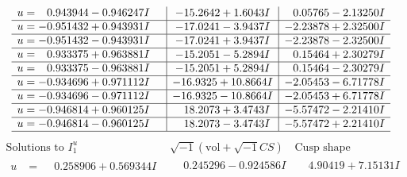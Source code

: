 \documentclass[1p]{elsarticle_modified}
\theoremstyle{definition}
\newcommand{\I}{\sqrt{-1}}
\begin{document}
$$\begin{array}{c|c|c}
\begin{aligned}
u &= \phantom{-}0.943944 - 0.946247 I\end{aligned}
 & -15.2642 + 1.6043 I & \phantom{-}0.05765 - 2.13250 I \\ \hline\begin{aligned}
u &= -0.951432 + 0.943931 I\end{aligned}
 & -17.0241 - 3.9437 I & -2.23878 + 2.32500 I \\ \hline\begin{aligned}
u &= -0.951432 - 0.943931 I\end{aligned}
 & -17.0241 + 3.9437 I & -2.23878 - 2.32500 I \\ \hline\begin{aligned}
u &= \phantom{-}0.933375 + 0.963881 I\end{aligned}
 & -15.2051 - 5.2894 I & \phantom{-}0.15464 + 2.30279 I \\ \hline\begin{aligned}
u &= \phantom{-}0.933375 - 0.963881 I\end{aligned}
 & -15.2051 + 5.2894 I & \phantom{-}0.15464 - 2.30279 I \\ \hline\begin{aligned}
u &= -0.934696 + 0.971112 I\end{aligned}
 & -16.9325 + 10.8664 I & -2.05453 - 6.71778 I \\ \hline\begin{aligned}
u &= -0.934696 - 0.971112 I\end{aligned}
 & -16.9325 - 10.8664 I & -2.05453 + 6.71778 I \\ \hline\begin{aligned}
u &= -0.946814 + 0.960125 I\end{aligned}
 & \phantom{-}18.2073 + 3.4743 I & -5.57472 - 2.21410 I \\ \hline\begin{aligned}
u &= -0.946814 - 0.960125 I\end{aligned}
 & \phantom{-}18.2073 - 3.4743 I & -5.57472 + 2.21410 I\\
 \hline 
 \end{array}$$\newpage$$\begin{array}{c|c|c}  
\text{Solutions to }I^u_{1}& \I (\text{vol} + \sqrt{-1}CS) & \text{Cusp shape}\\
 \hline 
\begin{aligned}
u &= \phantom{-}0.258906 + 0.569344 I\end{aligned}
 & \phantom{-}0.245296 - 0.924586 I & \phantom{-}4.90419 + 7.15131 I \\ \hline\begin{aligned}

\end{aligned}
\end{array}$$
\end{document}
